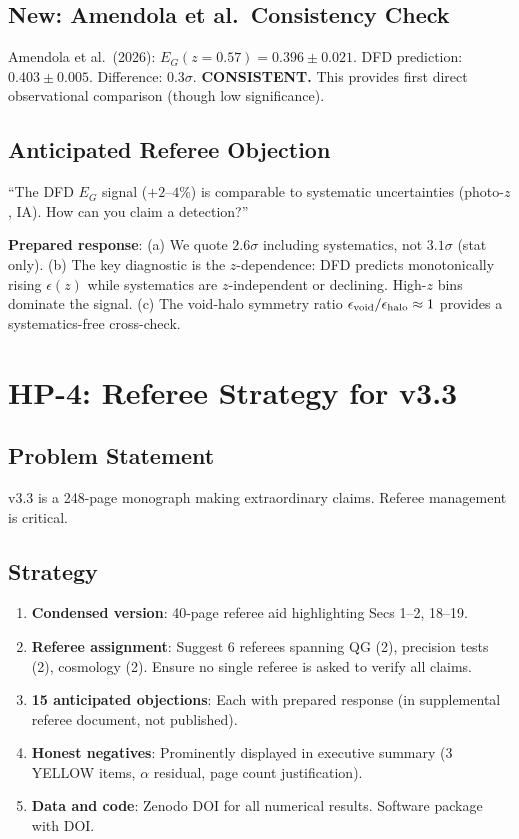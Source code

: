 \documentclass[11pt,a4paper]{article}
\begin{document}
\subsection{New: Amendola et al.\ Consistency Check}
Amendola et al.\ (2026): $E_G(z=0.57) = 0.396 \pm 0.021$. DFD prediction: $0.403 \pm 0.005$. Difference: $0.3\sigma$. \textbf{CONSISTENT.} This provides first direct observational comparison (though low significance).

\subsection{Anticipated Referee Objection}
``The DFD $E_G$ signal ($+2$--$4\%$) is comparable to systematic uncertainties (photo-$z$, IA). How can you claim a detection?''

\textbf{Prepared response}: (a) We quote $2.6\sigma$ including systematics, not $3.1\sigma$ (stat only). (b) The key diagnostic is the $z$-dependence: DFD predicts monotonically rising $\epsilon(z)$ while systematics are $z$-independent or declining. High-$z$ bins dominate the signal. (c) The void-halo symmetry ratio $\epsilon_{\rm void}/\epsilon_{\rm halo} \approx 1$ provides a systematics-free cross-check.

\section{HP-4: Referee Strategy for v3.3}

\subsection{Problem Statement}
v3.3 is a 248-page monograph making extraordinary claims. Referee management is critical.

\subsection{Strategy}
\begin{enumerate}[nosep]
\item \textbf{Condensed version}: 40-page referee aid highlighting Secs 1--2, 18--19.
\item \textbf{Referee assignment}: Suggest 6 referees spanning QG (2), precision tests (2), cosmology (2). Ensure no single referee is asked to verify all claims.
\item \textbf{15 anticipated objections}: Each with prepared response (in supplemental referee document, not published).
\item \textbf{Honest negatives}: Prominently displayed in executive summary (3 YELLOW items, $\alpha$ residual, page count justification).
\item \textbf{Data and code}: Zenodo DOI for all numerical results. Software package with DOI.
\end{enumerate}
\end{document}
